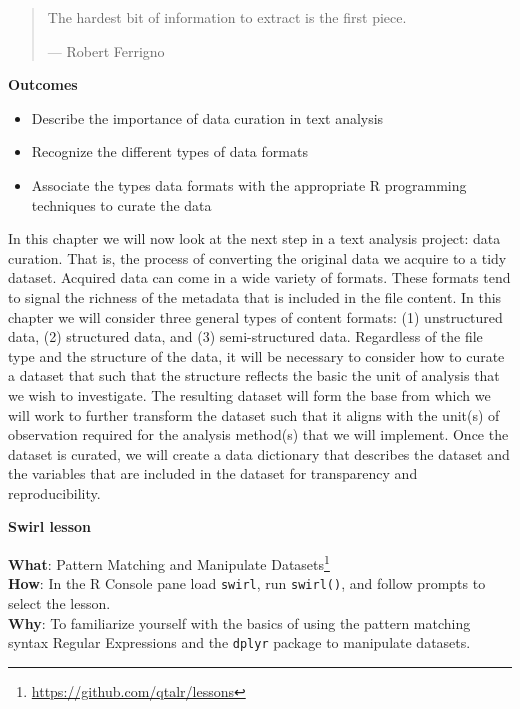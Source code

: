 \documentclass[
  letterpaper,
  DIV=11,
  numbers=noendperiod]{scrreport}
\providecommand{\tightlist}{%
  \setlength{\itemsep}{0pt}\setlength{\parskip}{0pt}}\usepackage{longtable,booktabs,array}
\theoremstyle{definition}
\theoremstyle{remark}
\DeclareRobustCommand{\href}[2]{#2\footnote{\url{#1}}}
\begin{document}
\begin{quote}
The hardest bit of information to extract is the first piece.

--- Robert Ferrigno
\end{quote}

\begin{tcolorbox}[enhanced jigsaw, breakable, colback=white, rightrule=.15mm, arc=.35mm, left=2mm, toprule=.15mm, leftrule=.75mm, bottomrule=.15mm, opacityback=0]

\textbf{ Outcomes}

\begin{itemize}
\tightlist
\item
  Describe the importance of data curation in text analysis
\item
  Recognize the different types of data formats
\item
  Associate the types data formats with the appropriate R programming
  techniques to curate the data
\end{itemize}

\end{tcolorbox}

In this chapter we will now look at the next step in a text analysis
project: data curation. That is, the process of converting the original
data we acquire to a tidy dataset. Acquired data can come in a wide
variety of formats. These formats tend to signal the richness of the
metadata that is included in the file content. In this chapter we will
consider three general types of content formats: (1) unstructured data,
(2) structured data, and (3) semi-structured data. Regardless of the
file type and the structure of the data, it will be necessary to
consider how to curate a dataset that such that the structure reflects
the basic the unit of analysis that we wish to investigate. The
resulting dataset will form the base from which we will work to further
transform the dataset such that it aligns with the unit(s) of
observation required for the analysis method(s) that we will implement.
Once the dataset is curated, we will create a data dictionary that
describes the dataset and the variables that are included in the dataset
for transparency and reproducibility.

\begin{tcolorbox}[enhanced jigsaw, breakable, colback=white, rightrule=.15mm, arc=.35mm, left=2mm, toprule=.15mm, leftrule=.75mm, bottomrule=.15mm, opacityback=0]

\textbf{ Swirl lesson}

\textbf{What}: \href{https://github.com/qtalr/lessons}{Pattern Matching
and Manipulate Datasets}\\
\textbf{How}: In the R Console pane load \texttt{swirl}, run
\texttt{swirl()}, and follow prompts to select the lesson.\\
\textbf{Why}: To familiarize yourself with the basics of using the
pattern matching syntax Regular Expressions and the \texttt{dplyr}
package to manipulate datasets.

\end{tcolorbox}
\end{document}
